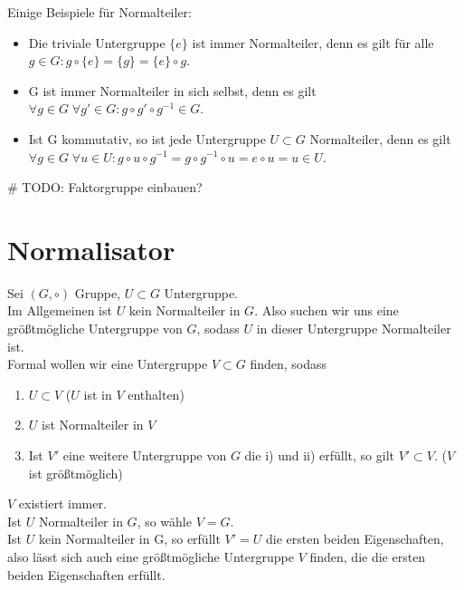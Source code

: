 \documentclass[a4paper]{article}
\begin{document}
    \begin{beispiel}
        Einige Beispiele für Normalteiler:
        \begin{itemize}
            \item Die triviale Untergruppe $\{e\} $ ist immer Normalteiler, denn es gilt für alle $g \in G: g \circ \{e\} = \{g\} = \{e\} \circ g$.
            \item G ist immer Normalteiler in sich selbst, denn es gilt $\forall g \in G \; \forall g' \in G: g \circ g' \circ g^{-1} \in G$.
           \item Ist G kommutativ, so ist jede Untergruppe $U \subset G$ Normalteiler, denn es gilt $\forall g \in G \; \forall u \in U: g \circ u \circ g ^{-1} = g \circ g ^{-1} \circ u = e \circ u = u \in U$.
        \end{itemize}
    \end{beispiel}
    
    # TODO: Faktorgruppe einbauen?

    \section{Normalisator}
    Sei $\left( G, \circ  \right)$ Gruppe, $U \subset G$ Untergruppe. \\
    Im Allgemeinen ist $U$ kein Normalteiler in $G$. Also suchen wir uns eine größtmögliche Untergruppe von $G$, sodass $U$ in dieser Untergruppe Normalteiler ist. \\
    Formal wollen wir eine Untergruppe $V \subset G$ finden, sodass
    \begin{enumerate}
        \item $U \subset V$ ($U$ ist in $V$ enthalten)
        \item $U$ ist Normalteiler in $V$
        \item Ist $V'$ eine weitere Untergruppe von $G$ die i) und ii) erfüllt, so gilt $V' \subset V$. ($V$ ist größtmöglich)
    \end{enumerate}

    \begin{bemerkung}
        $V$ existiert immer. \\
        Ist $U$ Normalteiler in $G$, so wähle $V = G$. \\
        Ist $U$ kein Normalteiler in G, so erfüllt $V' = U$ die ersten beiden Eigenschaften, also lässt sich auch eine größtmögliche Untergruppe $V$ finden, die die ersten beiden Eigenschaften erfüllt.
    \end{bemerkung}
\end{document}
